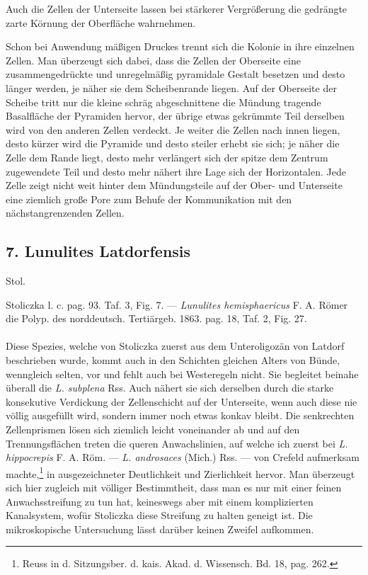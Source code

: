 \documentclass[a4paper, 11pt, oneside, german]{article}
\begin{document}
Auch die Zellen der Unterseite lassen bei stärkerer Vergrößerung die gedrängte zarte Körnung der Oberfläche wahrnehmen.

Schon bei Anwendung mäßigen Druckes trennt sich die Kolonie in ihre einzelnen Zellen. Man überzeugt sich dabei, dass die Zellen der Oberseite eine zusammengedrückte und unregelmäßig pyramidale Gestalt besetzen und desto länger werden, je näher sie dem Scheibenrande liegen. Auf der Oberseite der Scheibe tritt nur die kleine schräg abgeschnittene die Mündung tragende Basalfläche der Pyramiden hervor, der übrige etwas gekrümmte Teil derselben wird von den anderen Zellen verdeckt. Je weiter die Zellen nach innen liegen, desto kürzer wird die Pyramide und desto steiler erhebt sie sich; je näher die Zelle dem Rande liegt, desto mehr verlängert sich der spitze dem Zentrum zugewendete Teil und desto mehr nähert ihre Lage sich der Horizontalen. Jede Zelle zeigt nicht weit hinter dem Mündungsteile auf der Ober- und Unterseite eine ziemlich große Pore zum Behufe der Kommunikation mit den nächstangrenzenden Zellen.
\subsection{7. Lunulites Latdorfensis}
\begin{center}
Stol.

Stoliczka l. c. pag. 93. Taf. 3, Fig. 7. --- \emph{Lunulites hemisphaericus} F. A. Römer die Polyp. des norddeutsch. Tertiärgeb. 1863. pag. 18, Taf. 2, Fig. 27.
\end{center}
\paragraph{}
Diese Spezies, welche von Stoliczka zuerst aus dem Unteroligozän von Latdorf beschrieben wurde, kommt auch in den Schichten gleichen Alters von Bünde, wenngleich selten, vor und fehlt auch bei Westeregeln nicht. Sie begleitet beinahe überall die \emph{L. subplena} Rss. Auch nähert sie sich derselben durch die starke konsekutive Verdickung der Zellenschicht auf der Unterseite, wenn auch diese nie völlig ausgefüllt wird, sondern immer noch etwas konkav bleibt. Die senkrechten Zellenprismen lösen sich ziemlich leicht voneinander ab und auf den Trennungsflächen treten die queren Anwachslinien, auf welche ich zuerst bei \emph{L. hippocrepis} F. A. Röm. --- \emph{L. androsaces} (Mich.) Rss. --- von Crefeld aufmerksam machte,\footnote{Reuss in d. Sitzungsber. d. kais. Akad. d. Wissensch. Bd. 18, pag. 262.} in ausgezeichneter Deutlichkeit und Zierlichkeit hervor. Man überzeugt sich hier zugleich mit völliger Bestimmtheit, dass man es nur mit einer feinen Anwachsstreifung zu tun hat, keineswegs aber mit einem komplizierten Kanalsystem, wofür Stoliczka diese Streifung zu halten geneigt ist. Die mikroskopische Untersuchung lässt darüber keinen Zweifel aufkommen.
\end{document}
